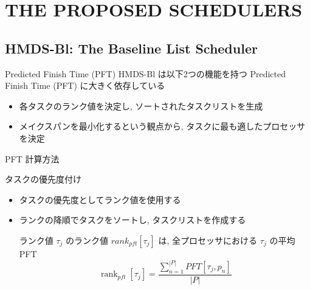 
\section{THE PROPOSED SCHEDULERS}
\label{sec: the proposed schedulers}


\subsection{HMDS-Bl: The Baseline List Scheduler}
\label{ssec: hmds-bl: the baseline list scheduler}

\begin{frame}{Predicted Finish Time (PFT)}
    HMDS-Bl は以下2つの機能を持つ Predicted Finish Time (PFT) に大きく依存している
    \begin{itemize}
        \item 各タスクのランク値を決定し, ソートされたタスクリストを生成
        \item メイクスパンを最小化するという観点から, タスクに最も適したプロセッサを決定
    \end{itemize}
\end{frame}

\begin{frame}{PFT 計算方法}
\end{frame}

\begin{frame}{タスクの優先度付け}
    \begin{itemize}
        \item タスクの優先度としてランク値を使用する
        \item ランクの降順でタスクをソートし, タスクリストを作成する
              \begin{block}{ランク値}
                  $\tau_j$ のランク値 $rank_{pft}[\tau_j]$ は, 全プロセッサにおける $\tau_j$ の平均 PFT
                  \begin{equation}
                      \operatorname{rank}_{p f t}\left[\tau_j\right]=\frac{\sum_{n=1}^{|P|} P F T\left[\tau_j, p_n\right]}{|P|}
                  \end{equation}
              \end{block}
    \end{itemize}
\end{frame}

